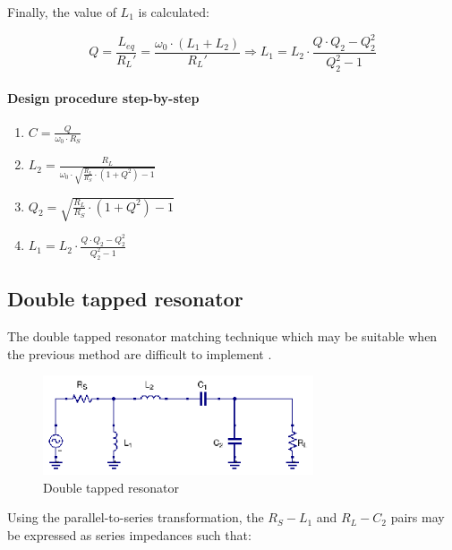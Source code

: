 \noindent Finally, the value of $L_1$ is calculated:

\begin{equation}
Q = \frac{L_{eq}}{R_L'} = \frac{\omega_0 \cdot (L_1 + L_2)}{R_L'} \Longrightarrow L_1 = L_2 \cdot \frac{Q \cdot Q_2 - Q_2^2}{Q_2^2 - 1}
\end{equation}

\paragraph{Design procedure step-by-step}

\begin{enumerate}
  \item $C  = \frac{Q}{\omega_0 \cdot R_S}$
  \item $L_2 = \frac{R_L}{\omega_0 \cdot \sqrt{\frac{R_L}{R_S} \cdot (1 + Q^2) - 1}}$
  \item $Q_2 = \sqrt{\frac{R_L}{R_S} \cdot (1 + Q^2) - 1}$
  \item $L_1 = L_2 \cdot \frac{Q \cdot Q_2 - Q_2^2}{Q_2^2 - 1}$
\end{enumerate}

\subsection{Double tapped resonator}
\noindent The double tapped resonator matching technique which may be suitable when the previous method are difficult to implement \cite{TheDesignofCMOSRFIC}.

\begin{figure}[H]
\centering
\includegraphics[width=80mm]{./images/Synthesis/Impedance_Matching/Double-Tapped-Resonator}
\caption{Double tapped resonator}
\label{fig:double-tapped-resonator}
\end{figure}

\noindent Using the parallel-to-series transformation, the $R_S-L_1$ and $R_L-C_2$ pairs may be expressed as series impedances such that:

